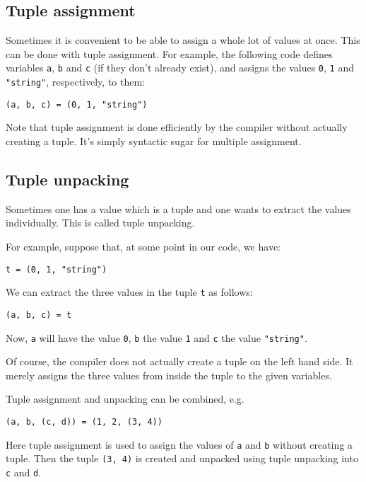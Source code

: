 \documentclass[a4paper,10pt]{article}
\newcommand{\code}{\lstinline}
\begin{document}
{\subsection{Tuple assignment}

Sometimes it is convenient to be able to assign a whole lot of values at once. This can be done
with tuple assignment. For example, the following code defines variables \code{a}, \code{b} and 
\code{c} (if they don't already exist), and assigns the values \code{0}, \code{1} and 
\code{"string"}, respectively, to them:

\begin{lstlisting}
(a, b, c) = (0, 1, "string")
\end{lstlisting}

Note that tuple assignment is done efficiently by the compiler without actually creating a tuple.
It's simply syntactic sugar for multiple assignment.

\subsection{Tuple unpacking}

Sometimes one has a value which is a tuple and one wants to extract the values individually. This
is called tuple unpacking. 

For example, suppose that, at some point in our code, we have:

\begin{lstlisting}
t = (0, 1, "string")
\end{lstlisting}

We can extract the three values in the tuple \code{t} as follows:

\begin{lstlisting}
(a, b, c) = t
\end{lstlisting}

Now, \code{a} will have the value \code{0}, \code{b} the value \code{1} and \code{c} the value 
\code{"string"}.

Of course, the compiler does not actually create a tuple on the left hand side. It merely assigns
the three values from inside the tuple to the given variables.

Tuple assignment and unpacking can be combined, e.g.

\begin{lstlisting}
(a, b, (c, d)) = (1, 2, (3, 4))
\end{lstlisting}

Here tuple assignment is used to assign the values of \code{a} and \code{b} without creating a
tuple. Then the tuple \code{(3, 4)} is created and unpacked using tuple unpacking into \code{c}
and \code{d}. 

}
\end{document}

